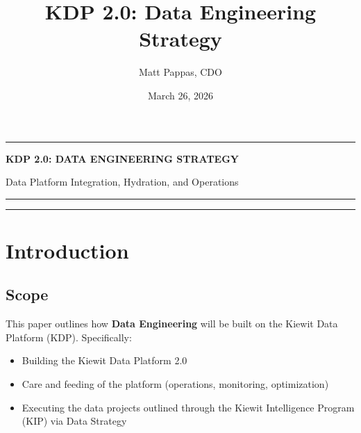 \documentclass[12pt, a4paper]{article}
\title{KDP 2.0: Data Engineering Strategy}
\author{Matt Pappas, CDO}
\date{March 26, 2026}
\begin{document}
\begin{center}
    \noindent\rule{\linewidth}{2pt}

    \vspace{0.5em}

    {\LARGE \bfseries \MakeUppercase{KDP 2.0: Data Engineering Strategy} \par}

    \vspace{0.25em}

    {\small Data Platform Integration, Hydration, and Operations}

    \vspace{0.5em}
    
    \noindent\rule{\linewidth}{2pt}

    \vspace{0.5em}


    \vspace{0.5em}

    \noindent\rule{\linewidth}{2pt}
\end{center}

\setcounter{page}{1}
\thispagestyle{firstpage}

\section{Introduction}

\subsection{Scope}
This paper outlines how \textbf{Data Engineering} will be built on the Kiewit Data Platform (KDP). Specifically:
\begin{itemize}
    \item Building the Kiewit Data Platform 2.0
    \item Care and feeding of the platform (operations, monitoring, optimization)
    \item Executing the data projects outlined through the Kiewit Intelligence Program (KIP) via Data Strategy
\end{itemize}
\end{document}
